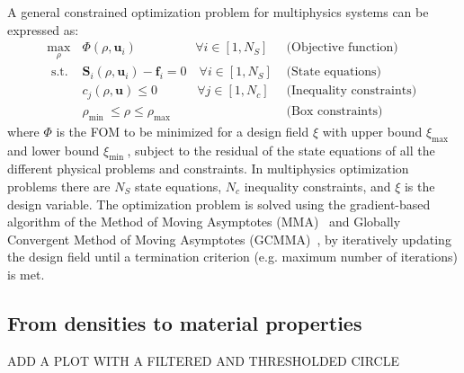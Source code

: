     A general constrained optimization problem for multiphysics systems can be
    expressed as:
    \begin{equation}
        \begin{array}{clr}
            \max\limits_{\rho}                        & \Phi(\rho, \mathbf{u}_i) \quad \quad \quad \quad
            \,\,\,\, \forall i \in\left[1, N_S\right] & \text { (Objective function) }                                                         \\
            \text { s.t. }                            & \mathbf{S}_i(\rho, \mathbf{u}_i)-\mathbf{f}_i=0 \quad
            \forall i \in\left[1, N_S\right]          & \text { (State equations) }                                                            \\
                                                      & c_j(\rho, \mathbf{u}) \leq 0 \quad \quad \quad \, \forall j \in\left[1,
            N_c\right]                                & \text { (Inequality constraints) }                                                     \\
                                                      & \rho_{\text {min }} \leq \rho \leq \rho_{\text {max }}                  & \text { (Box
                constraints) }
        \end{array}
    \end{equation}
    where $\Phi$ is the FOM to be minimized for a design field $\xi$ with upper
    bound $\xi_{\text {max }}$ and lower bound $\xi_{\text {min }}$,
    subject to the residual of the state equations of all the different physical
    problems and constraints. In multiphysics optimization problems
    there are $N_S$ state equations, $N_c$ inequality constraints, and $\xi$ is the
    design variable. The optimization problem is solved using
    the gradient-based algorithm of the Method of Moving
    Asymptotes (MMA)~\cite{MMA} and Globally Convergent Method of Moving Asymptotes
    (GCMMA)~\cite{GCMMA}, by iteratively updating the design field until a
    termination criterion (e.g. maximum number of iterations) is met.

    \subsection*{From densities to material properties}

    ADD A PLOT WITH A FILTERED AND THRESHOLDED CIRCLE

